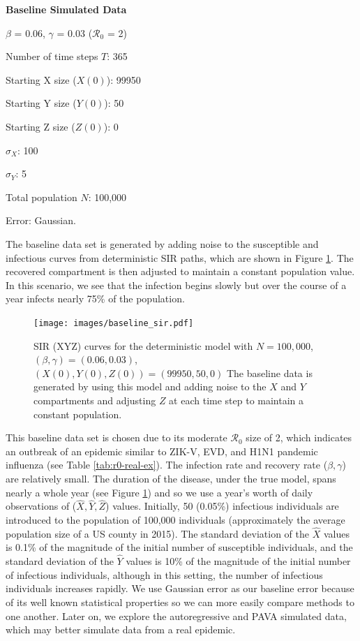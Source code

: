 \documentclass[12pt]{article}
\newcommand{\rr}{\ensuremath{\mathcal{R}_0}}
\begin{document}
\noindent \textbf{Baseline Simulated Data}
\begin{center}
	
	$\beta$ = 0.06, $\gamma$ = 0.03 ($\rr$ = 2)
	
	Number of time steps $T$: 365
	
	Starting X size ($X(0)$): 99950
	
	Starting Y size ($Y(0)$): 50
	
	Starting Z size ($Z(0)$): 0 
	
	$\sigma_X$: 100
	
	$\sigma_Y$: 5
	
	Total population $N$: 100,000

        Error: Gaussian.
	
      \end{center}
      The baseline data set is generated by adding noise to the susceptible and infectious curves from deterministic SIR paths, which are shown in Figure \ref{fig:baseline-data}.  The recovered compartment is then adjusted to maintain a constant population value.  In this scenario, we see that the infection begins slowly but over the course of a year infects nearly 75\% of the population.
      \begin{figure}
        \centering
        \texttt{[image: images/baseline\_sir.pdf]}
        \caption{SIR (XYZ) curves for the deterministic model with $N=100,000$, $(\beta, \gamma) = (0.06, 0.03)$, $(X(0), Y(0), Z(0))= (99950, 50,0)$  The baseline data is generated by using this model and adding noise to the $X$ and $Y$ compartments and adjusting $Z$ at each time step to maintain a constant population.}\label{fig:baseline-data}
        \end{figure}
      This baseline data set is chosen due to its moderate $\rr$ size of 2, which indicates an outbreak of an epidemic similar to ZIK-V, EVD, and H1N1 pandemic influenza (see Table \ref{tab:r0-real-ex}).  The infection rate and recovery rate ($\beta, \gamma$) are relatively small.  The duration of the disease, under the true model, spans nearly a whole year (see Figure \ref{fig:baseline-data}) and so we use a year's worth of daily observations of ($\hat{X},\hat{Y}, \hat{Z}$) values.  Initially, 50 (0.05\%) infectious individuals are introduced to the population of 100,000 individuals (approximately the average population size of a US county in 2015).  The standard deviation of the $\hat{X}$ values is 0.1\% of the magnitude of the initial number of susceptible individuals, and the standard deviation of the $\hat{Y}$ values is 10\% of the magnitude of the initial number of infectious individuals, although in this setting, the number of infectious individuals increases rapidly.  We use Gaussian error as our baseline error because of its well known statistical properties so we can more easily compare methods to one another.  Later on, we explore the autoregressive and PAVA simulated data, which may better simulate data from  a real epidemic.
\end{document}
